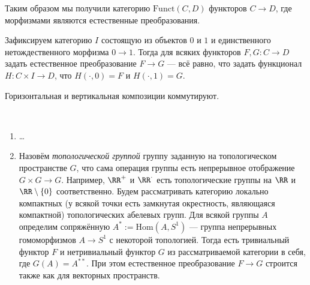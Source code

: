\documentclass[12pt,a4paper]{article}
\newcommand{\Hom}{\mathrm{Hom}}
\newcommand{\Funct}{\mathrm{Funct}}
\begin{document}
    \begin{remark}
        Таким образом мы получили категорию $\Funct(C, D)$ функторов $C \to D$, где морфизмами являются естественные преобразования.
    \end{remark}

    \begin{lemma}
        Зафиксируем категорию $I$ состоящую из объектов $0$ и $1$ и единственного нетождественного морфизма $0 \to 1$. Тогда для всяких функторов $F, G: C \to D$ задать естественное преобразование $F \to G$ --- всё равно, что задать функционал $H: C \times I \to D$, что $H({\cdot}, 0) = F$ и $H({\cdot}, 1) = G$.
    \end{lemma}

    \begin{lemma}
        Горизонтальная и вертикальная композиции коммутируют.
    \end{lemma}

    \begin{example}\ 
        \begin{enumerate}
            \item \dots
            \item Назовём \emph{топологической группой} группу заданную на топологическом пространстве $G$, что сама операция группы есть непрерывное отображение $G \times G \to G$. Например, $\RR^+$ и $\RR^\cdot$ есть топологические группы на $\RR$ и $\RR \setminus \{0\}$ соответственно. Будем рассматривать категорию локально компактных (у всякой точки есть замкнутая окрестность, являющаяся компактной) топологических абелевых групп. Для всякой группы $A$ определим сопряжённую $A^* := \Hom(A, S^1)$ --- группа непрерывных гомоморфизмов $A \to S^1$ с некоторой топологией. Тогда есть тривиальный функтор $F$ и нетривиальный функтор $G$ из рассматриваемой категории в себя, где $G(A) = A^{**}$. При этом естественное преобразование $F \to G$ строится также как для векторных пространств.
        \end{enumerate}
    \end{example}
\end{document}
